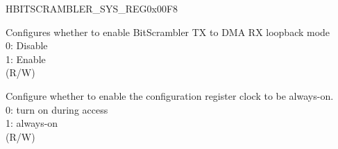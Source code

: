 \begin{register}{H}{BITSCRAMBLER\_SYS\_REG}{0x00F8}\label{regdesc:BITSCRAMBLERSYSREG}
%
%
%
\regnewline%
\begin{regdesc}\begin{reglist}
\label{fielddesc:BITSCRAMBLERLOOPMODE}\item [BITSCRAMBLER\_LOOP\_MODE] Configures whether to enable BitScrambler TX to DMA RX loopback mode\\
0: Disable\\
1: Enable\\
(R/W)
\label{fielddesc:BITSCRAMBLERCLKEN}\item [BITSCRAMBLER\_CLK\_EN] Configure whether to enable the configuration register clock to be always-on.\\
0: turn on during access\\
1: always-on\\
(R/W)
\end{reglist}\end{regdesc}
\end{register}


